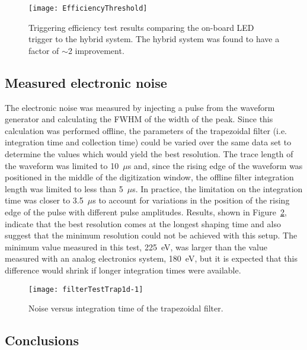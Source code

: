 			\begin{figure}
				\centering
				\texttt{[image: EfficiencyThreshold]}
				\caption[Triggering efficiency test results]
				{Triggering efficiency test results comparing the on-board LED trigger to the 
				hybrid system.  The hybrid system was found to have a factor of $\sim$2 improvement.}
				\label{fig:PPC2TriggeringEfficiencyTests}
			\end{figure}

		\subsection{Measured electronic noise}
		\label{sec:DeploymentPPC2SoudanAnalysisElectronicNoise}    
	
	The electronic noise was measured by injecting a pulse from the waveform generator and calculating the FWHM of the width of the peak.  Since this calculation was performed offline, the parameters of the trapezoidal filter (i.e. integration time and collection time) could be varied over the same data set to determine the values which would yield the best resolution.  The trace length of the waveform was limited to 10~$\mu$s and, since the rising edge of the waveform was positioned in the middle of the digitization window, the offline filter integration length was limited to less than 5~$\mu$s.  In practice, the limitation on the integration time was closer to 3.5~$\mu$s to account for variations in the position of the rising edge of the pulse with different pulse amplitudes.  Results, shown in Figure~\ref{fig:PPC2NoiseVsIntegrationTime}, indicate that the best resolution comes at the longest shaping time and also suggest that the minimum resolution could not be achieved with this setup.  The minimum value measured in this test, 225~eV, was larger than the value measured with an analog electronics system, 180~eV, but it is expected that this difference would shrink if longer integration times were available.
	
				\begin{figure}
					\centering
					\texttt{[image: filterTestTrap1d-1]}
					\caption[Noise versus integration time of the trapezoidal filter]
					{Noise versus integration time of the trapezoidal filter.}
					\label{fig:PPC2NoiseVsIntegrationTime}
				\end{figure}
		
		\subsection{Conclusions}
	

